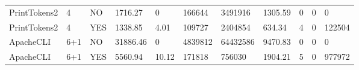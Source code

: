 \begin{table*}[]
\begin{tabular}{@{}lllllllllll@{}}
        PrintTokens2                                             & 4                                                            & NO                                                                 & 1716.27                                                         & 0                                                                        & 166644                                                         & 3491916                                                       & 1305.59                                                       & 0                                                                   & 0                                                                   & 0                                                           \\
        PrintTokens2                                             & 4                                                            & YES                                                                & 1338.85                                                         & 4.01                                                                     & 109727                                                         & 2404854                                                       & 634.34                                                        & 4                                                                   & 0                                                                   & 122504                                                      \\ \midrule
        ApacheCLI                                                & 6+1                                                          & NO                                                                 & 31886.46                                                        & 0                                                                        & 4839812                                                        & 64432586                                                      & 9470.83                                                       & 0                                                                   & 0                                                                   & 0                                                           \\
        ApacheCLI                                                & 6+1                                                          & YES                                                                & 5560.94                                                         & 10.12                                                                    & 171818                                                         & 756030                                                        & 1904.21                                                       & 5                                                                   & 0                                                                   & 977972                                                      \\ \midrule

\end{tabular}
\end{table*}
